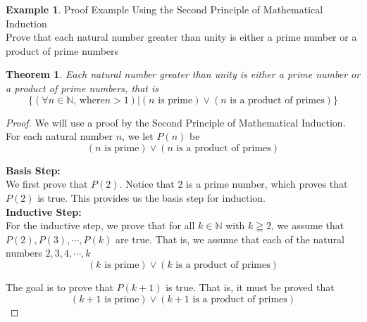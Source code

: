 \documentclass{book}
\newtheorem{theorem}{Theorem}[section]
\theoremstyle{definition}
\newtheorem{example}{Example}[definition]
\theoremstyle{remark}
\newcommand{\bb}[1]{\mathbb{#1}}
\begin{document}
\newpage
\begin{example}
Proof Example Using the Second Principle of Mathematical Induction \\

Prove that each natural number greater than unity is either a prime number or a product of prime numbers
\begin{tcolorbox}
    \begin{theorem}
        Each natural number greater than unity is either a prime number or a product of prime numbers, that is
            \begin{equation*}
                \{ (\forall n \in \bb{N} \text{, where} n > 1) | (n \text{ is prime}) \vee (n \text{ is a product of primes})  \}
            \end{equation*} 
    \end{theorem}
\end{tcolorbox}

\begin{proof}
        We will use a proof by the Second Principle of Mathematical Induction. For each natural number $n$, we let $P(n)$ be
            \begin{equation*}
                (n \text{ is prime}) \vee (n \text{ is a product of primes})
            \end{equation*}
        
        \textbf{Basis Step:} \\
            We first prove that $P(2)$. Notice that $2$ is a prime number, which proves that $P(2)$ is true. This provides us the basis step for induction. \\ 
        
        \textbf{Inductive Step:} \\
            For the inductive step, we prove that for all $k \in \bb{N}$ with $k \geqq 2$, we assume that $P(2), P(3), \cdots, P(k)$ are true. That is, we assume that each of the natural numbers $2,3,4, \cdots, k$
                \begin{equation*}
                   (k \text{ is prime}) \vee (k \text{ is a product of primes})
                \end{equation*}
            
            The goal is to prove that $P(k+1)$ is true. That is, it must be proved that  
                \begin{equation}
                \label{dnel}
                   (k+1 \text{ is prime}) \vee (k+1 \text{ is a product of primes})                
                \end{equation}
            

\end{proof}
\end{example}
\end{document}

